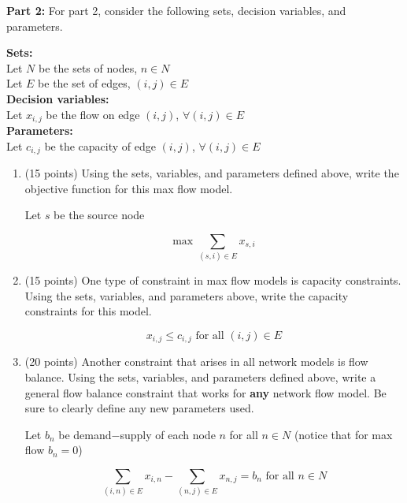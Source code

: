 \documentclass[letterpaper,oneside,12pt]{article}%
\newcommand{\blu}{\color{blue}}
\begin{document}
\textbf{Part 2:} For part 2, consider the following sets, decision variables, and parameters.

\noindent \textbf{Sets:}\\
\noindent Let $N$ be the sets of nodes, $n \in N$\\
Let $E$ be the set of edges, $(i,j) \in E$\\


\noindent \textbf{Decision variables:} \\
\noindent Let $x_{i,j}$ be the flow on edge $(i,j)$, $\forall (i,j) \in E$\\

\noindent \textbf{Parameters:}\\%
\noindent Let $c_{i,j}$ be the capacity of edge $(i,j)$, $\forall (i,j) \in E$


\begin{enumerate}[resume]
\item (15 points) Using the sets, variables, and parameters defined above, write the objective function for this max flow model.

{
\blu
Let $s$ be the source node

\[
\text{max } \sum_{(s,i) \in E} x_{s,i}
\]

}


\item (15 points) One type of constraint in max flow models is capacity constraints. Using the sets, variables, and parameters above, write the capacity constraints for this model. 

{\blu
\[
x_{i,j} \leq c_{i,j} \text{ for all $(i,j) \in E$}
\]
}

\item (20 points) Another constraint that arises in all network models is flow balance. Using the sets, variables, and parameters defined above, write a general flow balance constraint that works for \textbf{any} network flow model. Be sure to clearly define any new parameters used. 

{\blu
Let $b_n$ be demand$-$supply of each node $n$ for all $n \in N$ (notice that for max flow $b_n = 0$)

\[
\sum_{(i,n) \in E} x_{i,n} - \sum_{(n,j) \in E} x_{n,j} = b_n \text{ for all $n \in N$}
\]
}

\end{enumerate}
\end{document}
